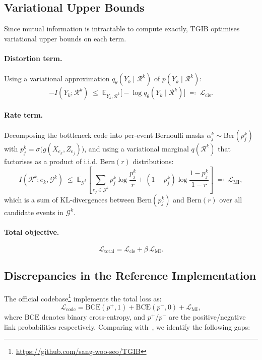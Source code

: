 \documentclass[11pt,a4paper]{article}
\newcommand{\R}{\mathcal{R}}
\newcommand{\G}{\mathcal{G}}
\newcommand{\KL}{\mathrm{KL}}
\newcommand{\Ber}{\mathrm{Ber}}
\newcommand{\Bern}{\mathrm{Bern}}
\newcommand{\E}{\mathbb{E}}
\newcommand{\I}{I}
\newcommand{\loss}{\mathcal{L}}
\newcommand{\BCE}{\mathrm{BCE}}
\begin{document}
\subsection{Variational Upper Bounds}

Since mutual information is intractable to compute exactly, TGIB
optimises variational upper bounds on each term.

\paragraph{Distortion term.}
Using a variational approximation $q_\theta(Y_k \mid \R^k)$ of
$p(Y_k \mid \R^k)$:
\begin{equation}
\label{eq:distortion}
-\I(Y_k ; \R^k) \;\leq\; \E_{Y_k, \R^k}\!\big[-\log q_\theta(Y_k \mid \R^k)\big]
  \;\eqqcolon\; \loss_{\text{cls}}.
\end{equation}

\paragraph{Rate term.}
Decomposing the bottleneck code into per-event Bernoulli masks
$\alpha_j^k \sim \Ber(p_j^k)$ with
$p_j^k = \sigma\!\big(g(X_{e_k}, Z_{e_j})\big)$, and using a
variational marginal $q(\R^k)$ that factorises as a product of i.i.d.
$\Bern(r)$ distributions:
\begin{equation}
\label{eq:rate}
\I(\R^k ; e_k, \G^k)
  \;\leq\; \E_{\G^k}\!\left[\sum_{e_j \in \G^k}
    p_j^k \log \frac{p_j^k}{r}
    + (1 - p_j^k) \log \frac{1 - p_j^k}{1 - r}
  \right]
  \;\eqqcolon\; \loss_{\text{MI}},
\end{equation}
which is a sum of $\KL$-divergences between
$\Bern(p_j^k)$ and $\Bern(r)$ over all candidate events in $\G^k$.

\paragraph{Total objective.}
\begin{equation}
\label{eq:total_loss}
\loss_{\text{total}} = \loss_{\text{cls}} + \beta\,\loss_{\text{MI}}.
\end{equation}

\subsection{Discrepancies in the Reference Implementation}

The official codebase\footnote{\url{https://github.com/sang-woo-seo/TGIB}}
implements the total loss as:
\begin{equation}
\label{eq:code_loss}
\loss_{\text{code}} = \BCE(p^+, 1) + \BCE(p^-, 0) + \loss_{\text{MI}},
\end{equation}
where $\BCE$ denotes binary cross-entropy, and $p^+$/$p^-$ are the
positive/negative link probabilities respectively. Comparing
 with~, we identify the
following gaps:
\end{document}
